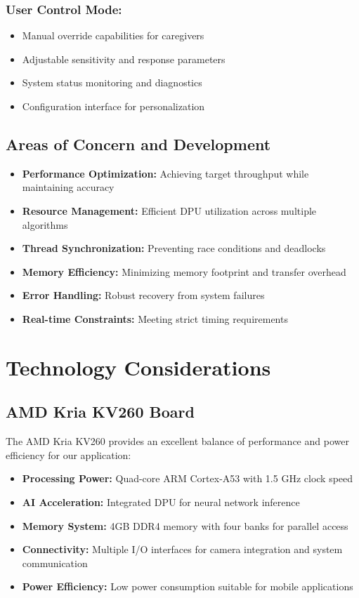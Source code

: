 \subsubsection{User Control Mode:}
\begin{itemize}
\item Manual override capabilities for caregivers
\item Adjustable sensitivity and response parameters
\item System status monitoring and diagnostics
\item Configuration interface for personalization
\end{itemize}

\subsection{Areas of Concern and Development}\label{subsec:areas-concern}

\begin{itemize}
\item \textbf{Performance Optimization:} Achieving target throughput while maintaining accuracy
\item \textbf{Resource Management:} Efficient DPU utilization across multiple algorithms
\item \textbf{Thread Synchronization:} Preventing race conditions and deadlocks
\item \textbf{Memory Efficiency:} Minimizing memory footprint and transfer overhead
\item \textbf{Error Handling:} Robust recovery from system failures
\item \textbf{Real-time Constraints:} Meeting strict timing requirements
\end{itemize}

\section{Technology Considerations}\label{sec:technology-considerations}

\subsection{AMD Kria KV260 Board}
The AMD Kria KV260 provides an excellent balance of performance and power efficiency for our application:

\begin{itemize}
\item \textbf{Processing Power:} Quad-core ARM Cortex-A53 with 1.5 GHz clock speed
\item \textbf{AI Acceleration:} Integrated DPU for neural network inference
\item \textbf{Memory System:} 4GB DDR4 memory with four banks for parallel access
\item \textbf{Connectivity:} Multiple I/O interfaces for camera integration and system communication
\item \textbf{Power Efficiency:} Low power consumption suitable for mobile applications
\end{itemize}

